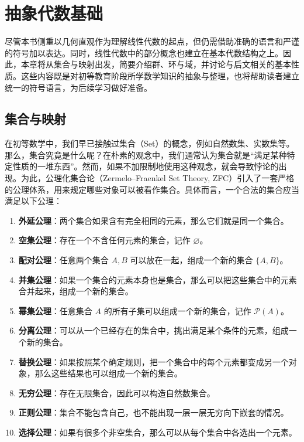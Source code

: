 \chapter{抽象代数基础}
\label{chap_abstract_algebra}
尽管本书侧重以几何直观作为理解线性代数的起点，但仍需借助准确的语言和严谨的符号加以表达。同时，线性代数中的部分概念也建立在基本代数结构之上。因此，本章将从集合与映射出发，简要介绍群、环与域，并讨论与后文相关的基本性质。这些内容既是对初等教育阶段所学数学知识的抽象与整理，也将帮助读者建立统一的符号语言，为后续学习做好准备。

\section{集合与映射}
\label{sec_sets_maps}

在初等数学中，我们早已接触过集合（Set）的概念，例如自然数集、实数集等。那么，集合究竟是什么呢？在朴素的观念中，我们通常认为集合就是``满足某种特定性质的一堆东西''。然而，如果不加限制地使用这种观念，就会导致悖论的出现。为此，公理化集合论（Zermelo--Fraenkel Set Theory, ZFC）引入了一套严格的公理体系，用来规定哪些对象可以被看作集合。具体而言，一个合法的集合应当满足以下公理：
\begin{enumerate}
    \item \textbf{外延公理}：两个集合如果含有完全相同的元素，那么它们就是同一个集合。
    \item \textbf{空集公理}：存在一个不含任何元素的集合，记作 \(\varnothing\)。
    \item \textbf{配对公理}：任意两个集合 \(A,B\) 可以放在一起，组成一个新的集合 \(\{A,B\}\)。
    \item \textbf{并集公理}：如果一个集合的元素本身也是集合，那么可以把这些集合中的元素合并起来，组成一个新的集合。
    \item \textbf{幂集公理}：任意集合 \(A\) 的所有子集可以组成一个新的集合，记作 \(\mathcal P(A)\)。
    \item \textbf{分离公理}：可以从一个已经存在的集合中，挑出满足某个条件的元素，组成一个新的集合。
    \item \textbf{替换公理}：如果按照某个确定规则，把一个集合中的每个元素都变成另一个对象，那么这些结果也可以组成一个新的集合。
    \item \textbf{无穷公理}：存在无限集合，因此可以构造自然数集合。
    \item \textbf{正则公理}：集合不能包含自己，也不能出现一层一层无穷向下嵌套的情况。
    \item \textbf{选择公理}：如果有很多个非空集合，那么可以从每个集合中各选出一个元素。
\end{enumerate}

